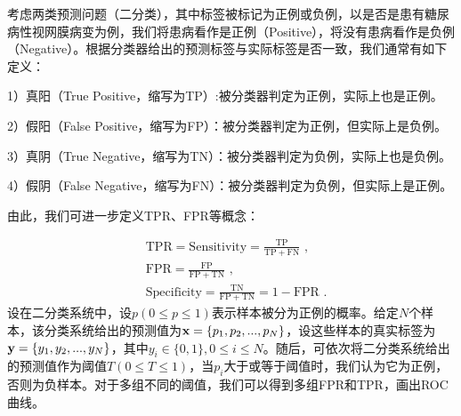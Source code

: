 考虑两类预测问题（二分类），其中标签被标记为正例或负例，以是否是患有糖尿病性视网膜病变为例，我们将患病看作是正例（Positive），将没有患病看作是负例（Negative）。根据分类器给出的预测标签与实际标签是否一致，我们通常有如下定义：

1）真阳（True Positive，缩写为TP）:被分类器判定为正例，实际上也是正例。

2）假阳（False Positive，缩写为FP）：被分类器判定为正例，但实际上是负例。

3）真阴（True Negative，缩写为TN）：被分类器判定为负例，实际上也是负例。

4）假阴（False Negative，缩写为FN）：被分类器判定为负例，但实际上是正例。

\noindent 由此，我们可进一步定义TPR、FPR等概念：

\vspace{-0.7cm}
\begin{align}
	&\mathrm{TPR}=\mathrm{Sensitivity}=\frac{\mathrm{TP}}{\mathrm{TP}+\mathrm{FN}}\,\, ,\\
	&\mathrm{FPR}=\frac{\mathrm{FP}}{\mathrm{FP}+\mathrm{TN}}\,\, ,\\
	&\mathrm{Specificity}=\frac{\mathrm{TN}}{\mathrm{FP}+\mathrm{TN}}=1-\mathrm{FPR}\,\, .
\end{align}
设在二分类系统中，设$p(0\leq p \leq 1)$表示样本被分为正例的概率。给定$N$个样本，该分类系统给出的预测值为$\mathbf{x}=\{p_1,p_2,...,p_N
\}$，设这些样本的真实标签为$\mathbf{y}=\{y_1,y_2,...,y_N\}$，其中$y_i \in \{0,1\},0\leq i \le N$。随后，可依次将二分类系统给出的预测值作为阈值$T(0\leq T \leq 1)$，当$p_i$大于或等于阈值时，我们认为它为正例，否则为负样本。对于多组不同的阈值，我们可以得到多组FPR和TPR，画出ROC曲线。

